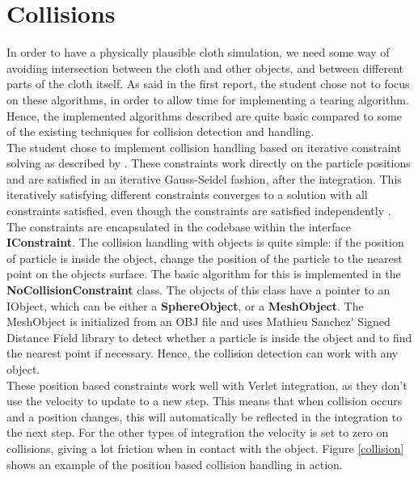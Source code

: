 \ifx\isEmbedded\undefined

\graphicspath{{../img/}}

\tableofcontents
\pagebreak

\fi

\section{Collisions} \label{sec_collision}

In order to have a physically plausible cloth simulation, we need some way of avoiding intersection between the cloth and other objects, and between different parts of the cloth itself. As said in the first report, the student chose not to focus on these algorithms, in order to allow time for implementing a tearing algorithm. Hence, the implemented algorithms described are quite basic compared to some of the existing techniques for collision detection and handling.\\

The student chose to implement collision handling based on iterative constraint solving as described by \cite{position_based_dyn}. These constraints work directly on the particle positions and are satisfied in an iterative Gauss-Seidel fashion, after the integration. This iteratively satisfying different constraints converges to a solution with all constraints satisfied, even though the constraints are satisfied independently \citep[chap. 7]{parent_book, position_based_dyn}. The constraints are encapsulated in the codebase within the interface {\bf IConstraint}. The collision handling with objects is quite simple: if the position of particle is inside the object, change the position of the particle to the nearest point on the objects surface. The basic algorithm for this is implemented in the {\bf NoCollisionConstraint} class. The objects of this class have a pointer to an IObject, which can be either a {\bf SphereObject}, or a {\bf MeshObject}. The MeshObject is initialized from an OBJ file and uses Mathieu Sanchez' Signed Distance Field library to detect whether a particle is inside the object and to find the nearest point if necessary. Hence, the collision detection can work with any object.\\

These position based constraints work well with Verlet integration, as they don't use the velocity to update to a new step. This means that when collision occurs and a position changes, this will automatically be reflected in the integration to the next step. For the other types of integration the velocity is set to zero on collisions, giving a lot friction when in contact with the object. Figure \ref{collision} shows an example of the position based collision handling in action.\\


